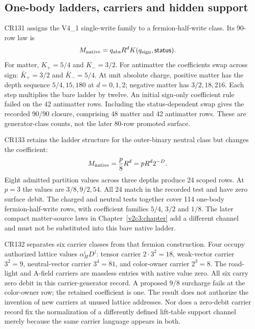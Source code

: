 \subsection{One-body ladders, carriers and hidden support}

CR131 assigns the V4\_1 single-write family to a fermion-half-write class. Its 90-row law is
\begin{equation}
M_{\rm native}=q_{\rm abs}R^d K(q_{\rm sign},\mathsf{status}).
\end{equation}
For matter, $K_+=5/4$ and $K_-=3/2$. For antimatter the coefficients swap across sign: $\bar K_+=3/2$ and $\bar K_-=5/4$. At unit absolute charge, positive matter has the depth sequence $5/4,15,180$ at $d=0,1,2$; negative matter has $3/2,18,216$. Each step multiplies the bare ladder by twelve. An initial sign-only coefficient rule failed on the 42 antimatter rows. Including the status-dependent swap gives the recorded 90/90 closure, comprising 48 matter and 42 antimatter rows. These are generator-class counts, not the later 80-row promoted surface.

CR133 retains the ladder structure for the outer-binary neutral class but changes the coefficient:
\begin{equation}
M_{\rm native}=\frac{p}{8}R^d=pR^d2^{-D}.
\end{equation}
Eight admitted partition values across three depths produce 24 scoped rows. At $p=3$ the values are $3/8,9/2,54$. All 24 match in the recorded test and have zero surface debit. The charged and neutral tests together cover 114 one-body fermion-half-write rows, with coefficient families $5/4$, $3/2$ and $1/8$. The later compact matter-source laws in Chapter~\ref{v2c3:chapter} add a different channel and must not be substituted into this bare native ladder.

CR132 separates six carrier classes from that fermion construction. Four occupy authorized lattice values $\alpha_H^iD^j$: tensor carrier $2\cdot3^2=18$, weak-vector carrier $3^2=9$, neutral-vector carrier $3^4=81$, and color-owner carrier $2^3=8$. The road-light and A-field carriers are massless entries with native value zero. All six carry zero debit in this carrier-generator record. A proposed $9/8$ surcharge fails at the color-owner row; the retained coefficient is one. The result does not authorize the invention of new carriers at unused lattice addresses. Nor does a zero-debit carrier record fix the normalization of a differently defined lift-table support channel merely because the same carrier language appears in both.

